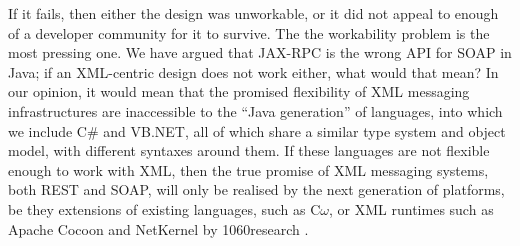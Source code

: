 If it fails, then either the design was unworkable, or it did not appeal
to enough of a developer community for it to survive. The the
workability problem is the most pressing one. We have argued that
JAX-RPC is the wrong API for SOAP in Java; if an XML-centric design does
not work either, what would that mean? In our opinion, it would mean
that the promised flexibility of XML messaging infrastructures are inaccessible
to the ``Java generation'' of languages, into which we include C\# and VB.NET, all of
which share a similar type system and object model, with different
syntaxes around them. If these languages are not flexible enough to
work with XML, then the true promise of XML messaging systems, both REST
and SOAP, will only be realised by the next generation of platforms, be
they extensions of existing languages, such as C$\omega$, or 
XML runtimes such as Apache Cocoon and NetKernel by 1060research
\cite{MSFT:TransitionsInProgrammingModels,pjr:NKonTSS}.
